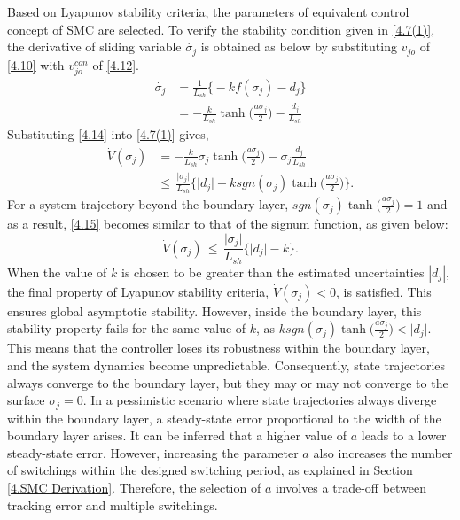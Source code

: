 Based on Lyapunov stability criteria, the parameters of equivalent control concept of SMC are selected. To verify the stability condition given in \eqref{4.7(1)}, the derivative of sliding variable $\dot{\sigma_{j}}$ is obtained as below by substituting $v_{jo}$ of \eqref{4.10} with $v^{con}_{jo}$ of \eqref{4.12}.
\begin{equation} \label{4.14} 
	\begin{aligned}
		\dot{\sigma_{j}} & = \frac{1}{L_{sh}}\Big\{-kf(\sigma_{j}) - d_{j}\Big\} \\ 
		& = -\frac{k}{L_{sh}}\tanh\Big(\frac{a\sigma_{j}}{2} \Big) - \frac{d_{j}}{L_{sh}}
	\end{aligned}
\end{equation}
Substituting \eqref{4.14} into \eqref{4.7(1)} gives,
\begin{equation} \label{4.15}
	\begin{aligned}
		\dot{V}(\sigma_{j}) & = -\frac{k}{L_{sh}} \sigma_{j} \tanh\Big(\frac{a\sigma_{j}}{2} \Big) - \sigma_{j}\frac{d_{j}}{L_{sh}}  \\
		& \leq \, \frac{\vert \sigma_{j} \vert}{L_{sh}} \Big\{ \vert d_{j}\vert - k sgn(\sigma_{j}) \tanh\Big(\frac{a\sigma_{j}}{2} \Big) \Big\}. 
	\end{aligned}
\end{equation}
For a system trajectory beyond the boundary layer, $sgn(\sigma_{j}) \tanh\Big(\frac{a\sigma_{j}}{2} \Big) = 1$ and as a result, \eqref{4.15} becomes similar to that of the signum function, as given below: 
\begin{equation}
	\dot{V}(\sigma_{j}) \, \leq \, \frac{\vert \sigma_{j} \vert}{L_{sh}} \Big\{ \vert d_{j}\vert - k \Big\}. 
\end{equation}
When the value of $k$ is chosen to be greater than the estimated uncertainties $|d_j|$, the final property of Lyapunov stability criteria, $\dot{V}(\sigma_{j}) < 0$, is satisfied. This ensures global asymptotic stability. However, inside the boundary layer, this stability property fails for the same value of $k$, as $k sgn(\sigma_{j}) \tanh\Big(\frac{a\sigma_{j}}{2} \Big) < \vert d_{j}\vert$. This means that the controller loses its robustness within the boundary layer, and the system dynamics become unpredictable. Consequently, state trajectories always converge to the boundary layer, but they may or may not converge to the surface $\sigma_{j} = 0$. In a pessimistic scenario where state trajectories always diverge within the boundary layer, a steady-state error proportional to the width of the boundary layer arises. It can be inferred that a higher value of $a$ leads to a lower steady-state error. However, increasing the parameter $a$ also increases the number of switchings within the designed switching period, as explained in Section \ref{4.SMC Derivation}. Therefore, the selection of $a$ involves a trade-off between tracking error and multiple switchings.

